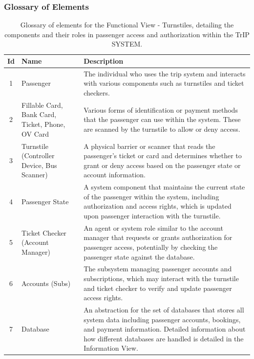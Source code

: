 \subsubsection{Glossary of Elements}
\begin{table}[H]
    \centering
    \begin{tabular}{@{}clp{9cm}@{}} %
    \toprule
    \textbf{Id} & \textbf{Name} & \textbf{Description} \\
    \midrule
    1 & Passenger & The individual who uses the trip system and interacts with various components such as turnstiles and ticket checkers. \\
    2 & Fillable Card, Bank Card, Ticket, Phone, OV Card & Various forms of identification or payment methods that the passenger can use within the system. These are scanned by the turnstile to allow or deny access. \\
    3 & Turnstile (Controller Device, Bus Scanner) & A physical barrier or scanner that reads the passenger's ticket or card and determines whether to grant or deny access based on the passenger state or account information. \\
    4 & Passenger State & A system component that maintains the current state of the passenger within the system, including authorization and access rights, which is updated upon passenger interaction with the turnstile. \\
    5 & Ticket Checker (Account Manager) & An agent or system role similar to the account manager that requests or grants authorization for passenger access, potentially by checking the passenger state against the database. \\
    6 & Accounts (Subs) & The subsystem managing passenger accounts and subscriptions, which may interact with the turnstile and ticket checker to verify and update passenger access rights. \\
    7 & Database & An abstraction for the set of databases that stores all system data including passenger accounts, bookings, and payment information. Detailed information about how different databases are handled is detailed in the Information View.\\
    \bottomrule
    \end{tabular}
    \caption{Glossary of elements for the Functional View - Turnstiles, detailing the components and their roles in passenger access and authorization within the TrIP SYSTEM.}
    \label{tab:glossary_turnstiles}
\end{table}

